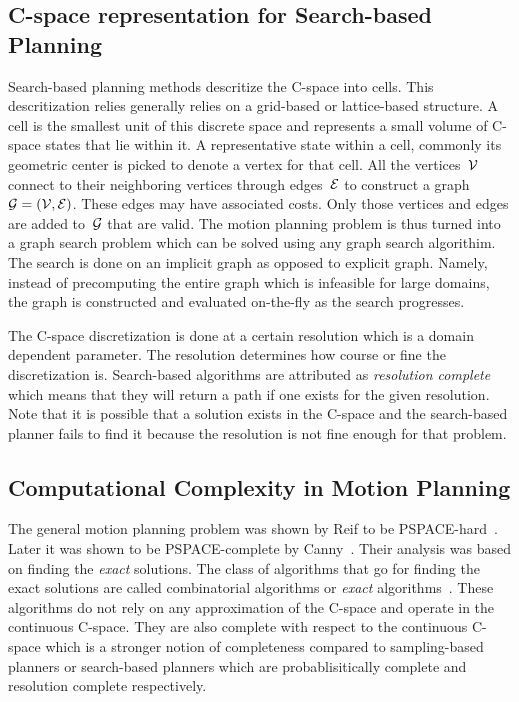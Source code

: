 \documentclass[a4paper,10pt]{article}
\begin{document}
\subsection{C-space representation for Search-based Planning}
Search-based planning methods descritize the C-space into cells. This descritization relies generally relies on a grid-based or lattice-based structure. A cell is the smallest unit of this discrete space and represents a small volume of C-space states that lie within it. A representative state within a cell, commonly its geometric center is picked to denote a vertex for that cell. All the vertices~$\mathcal{V}$ connect to their neighboring vertices through edges~$\mathcal{E}$ to construct a graph~$\mathcal{G} = (\mathcal{V}, \mathcal{E})$. These edges may have associated costs. Only those vertices and edges are added to~$\mathcal{G}$ that are valid. The motion planning problem is thus turned into a graph search problem which can be solved using any graph search algorithim. The search is done on an implicit graph as opposed to explicit graph. Namely, instead of precomputing the entire graph which is infeasible for large domains, the graph is constructed and evaluated on-the-fly as the search progresses.

The C-space discretization is done at a certain resolution which is a domain dependent parameter. The resolution determines how course or fine the discretization is. Search-based algorithms are attributed as \emph{resolution complete} which means that they will return a path if one exists for the given resolution. Note that it is possible that a solution exists in the C-space and the search-based planner fails to find it because the resolution is not fine enough for that problem.

\subsection{Computational Complexity in Motion Planning}
The general motion planning problem was shown by Reif to be PSPACE-hard~\cite{reif1979complexity}. Later it was shown to be PSPACE-complete by Canny~\cite{canny1988complexity}. Their analysis was based on finding the \emph{exact} solutions. The class of algorithms that go for finding the exact solutions are called combinatorial algorithms or \emph{exact} algorithms~\cite{lavalle2006planning}. These algorithms do not rely on any approximation of the C-space and operate in the continuous C-space. They are also complete with respect to the continuous C-space which is a stronger notion of completeness compared to sampling-based planners or search-based planners which are probablisitically complete and resolution complete respectively.
\end{document}
